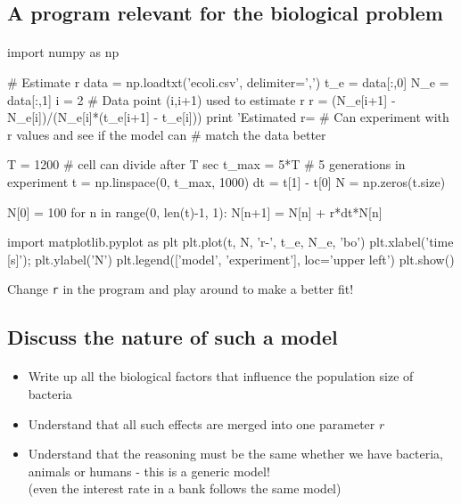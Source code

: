\documentclass[%
twoside,                 %
final,                   %
10pt]{article}
\begin{document}
\subsection{A program relevant for the biological problem}



\paragraph{}
\bpypro
import numpy as np

# Estimate r
data = np.loadtxt('ecoli.csv', delimiter=',')
t_e = data[:,0]
N_e = data[:,1]
i = 2  # Data point (i,i+1) used to estimate r
r = (N_e[i+1] - N_e[i])/(N_e[i]*(t_e[i+1] - t_e[i]))
print 'Estimated r=%
# Can experiment with r values and see if the model can
# match the data better

T = 1200     # cell can divide after T sec
t_max = 5*T  # 5 generations in experiment
t = np.linspace(0, t_max, 1000)
dt = t[1] - t[0]
N = np.zeros(t.size)

N[0] = 100
for n in range(0, len(t)-1, 1):
    N[n+1] = N[n] + r*dt*N[n]

import matplotlib.pyplot as plt
plt.plot(t, N, 'r-', t_e, N_e, 'bo')
plt.xlabel('time [s]');  plt.ylabel('N')
plt.legend(['model', 'experiment'], loc='upper left')
plt.show()
\epypro

Change \Verb!r! in the program and play around to make a better fit!



\subsection{Discuss the nature of such a model}


\paragraph{}
\begin{itemize}
 \item Write up all the biological factors that influence the
   population size of bacteria

 \item Understand that all such effects are merged into one parameter $r$

 \item Understand that the reasoning must be the same whether we
   have bacteria, animals or humans - this is a generic model!\\
   (even the interest rate in a bank follows the same model)
\end{itemize}
\end{document}
